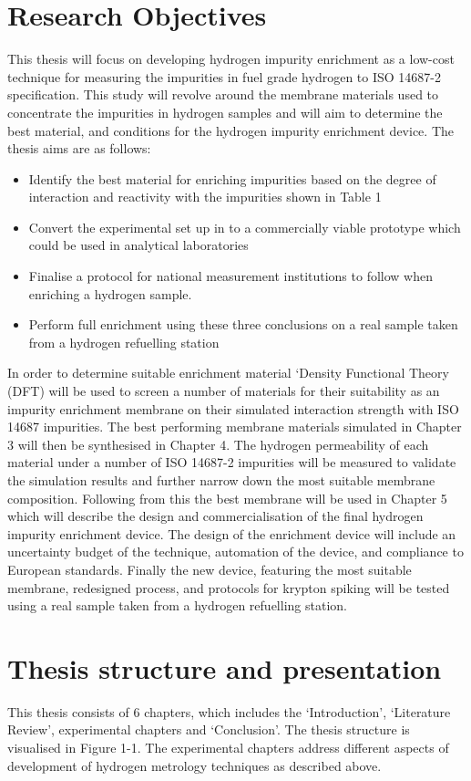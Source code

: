 \section{Research Objectives}
This thesis will focus on developing hydrogen impurity enrichment as a low-cost technique for measuring the impurities in fuel grade hydrogen to ISO 14687-2 specification. This study will revolve around the membrane materials used to concentrate the impurities in hydrogen samples and will aim to determine the best material, and conditions for the hydrogen impurity enrichment device. 
The thesis aims are as follows:
\begin{itemize}
\item Identify the best material for enriching impurities based on the degree of interaction and reactivity with the impurities shown in Table 1 
\item Convert the experimental set up in to a commercially viable prototype which could be used in analytical laboratories
\item Finalise a protocol for national measurement institutions to follow when enriching a hydrogen sample. 
\item Perform full enrichment using these three conclusions on a real sample taken from a hydrogen refuelling station
\end{itemize}
In order to determine suitable enrichment material ‘Density Functional Theory (DFT) will be used to screen a number of materials for their suitability as an impurity enrichment membrane on their simulated interaction strength with ISO 14687 impurities. 
The best performing membrane materials simulated in Chapter 3 will then be synthesised in Chapter 4. The hydrogen permeability of each material under a number of ISO 14687-2 impurities will be measured to validate the simulation results and further narrow down the most suitable membrane composition. 
Following from this the best membrane will be used in Chapter 5 which will describe the design and commercialisation of the final hydrogen impurity enrichment device. The design of the enrichment device will include an uncertainty budget of the technique, automation of the device, and compliance to European standards.
Finally the new device, featuring the most suitable membrane, redesigned process, and protocols for krypton spiking will be tested using a real sample taken from a hydrogen refuelling station.


\section{Thesis structure and presentation}
This thesis consists of 6 chapters, which includes the ‘Introduction’, ‘Literature Review’, experimental chapters and ‘Conclusion’. The thesis structure is visualised in Figure 1-1. The experimental chapters address different aspects of development of hydrogen metrology techniques as described above. 


